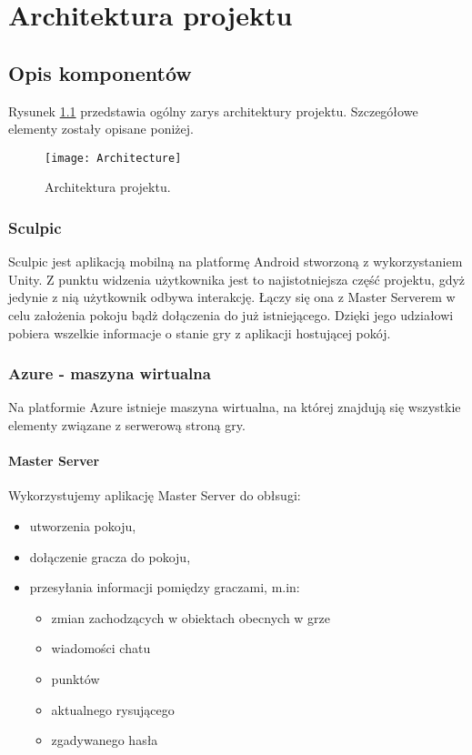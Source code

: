 \chapter{Architektura projektu}
\section{Opis komponentów}
Rysunek \ref{fig:architecture} przedstawia ogólny zarys architektury projektu. Szczegółowe elementy zostały opisane poniżej.

\begin{figure}[htbp]
\centering
\texttt{[image: Architecture]}
\caption{Architektura projektu.}
\label{fig:architecture}
\end{figure}

\subsection{Sculpic}
Sculpic jest aplikacją mobilną na platformę Android stworzoną z wykorzystaniem Unity. Z punktu widzenia użytkownika jest to najistotniejsza część projektu, gdyż jedynie z nią użytkownik odbywa interakcję. Łączy się ona z Master Serverem w celu założenia pokoju bądż dołączenia do już istniejącego. Dzięki jego udziałowi pobiera wszelkie informacje o stanie gry z aplikacji hostującej pokój.

\subsection{Azure - maszyna wirtualna}
Na platformie Azure istnieje maszyna wirtualna, na której znajdują się wszystkie elementy związane z serwerową stroną gry.

\subsubsection{Master Server}
Wykorzystujemy aplikację Master Server do obłsugi:
\begin{itemize}
    \item utworzenia pokoju,
    \item dołączenie gracza do pokoju,
    \item przesyłania informacji pomiędzy graczami, m.in:
    \begin{itemize}
        \item zmian zachodzących w obiektach obecnych w grze
        \item wiadomości chatu
        \item punktów
        \item aktualnego rysującego
        \item zgadywanego hasła
    \end{itemize}
\end{itemize}

